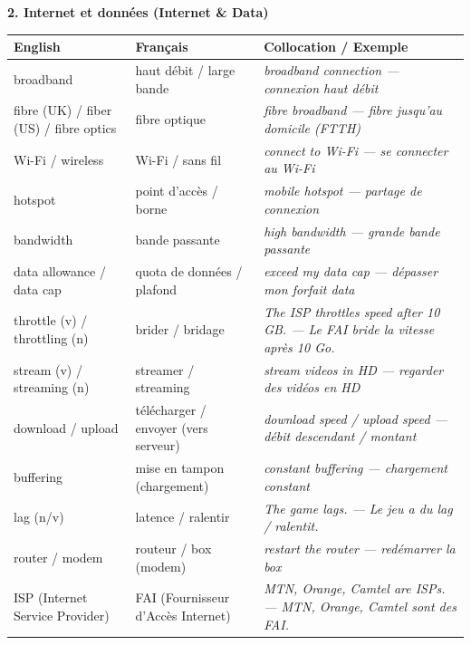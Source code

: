 \documentclass[11pt]{article}
\newcommand{\cle}[1]{{\popxbold\color{popdark}#1}}
\newcommand{\eng}[1]{\ifmmode\text{\textit{#1}}\else\begingroup\selectlanguage{english}\itshape #1\endgroup\fi}
\begin{document}
\textbf{2. Internet et données (Internet \& Data)}
\begin{center}
\begin{tabularx}{\linewidth}{|X|X|X|}\hline
\rowcolor{popgreenL} \textbf{English} & \textbf{Français} & \textbf{Collocation / Exemple} \\ \hline
\cle{broadband} & haut débit / large bande & \eng{broadband connection} — connexion haut débit \\ \hline
\cle{fibre (UK)} / \cle{fiber (US)} / \cle{fibre optics} & fibre optique & \eng{fibre broadband} — fibre jusqu'au domicile (FTTH) \\ \hline
\cle{Wi-Fi} / \cle{wireless} & Wi-Fi / sans fil & \eng{connect to Wi-Fi} — se connecter au Wi-Fi \\ \hline
\cle{hotspot} & point d'accès / borne & \eng{mobile hotspot} — partage de connexion \\ \hline
\cle{bandwidth} & bande passante & \eng{high bandwidth} — grande bande passante \\ \hline
\cle{data allowance} / \cle{data cap} & quota de données / plafond & \eng{exceed my data cap} — dépasser mon forfait data \\ \hline
\cle{throttle} (v) / \cle{throttling} (n) & brider / bridage & \eng{The ISP throttles speed after 10 GB.} — Le FAI bride la vitesse après 10 Go. \\ \hline
\cle{stream} (v) / \cle{streaming} (n) & streamer / streaming & \eng{stream videos in HD} — regarder des vidéos en HD \\ \hline
\cle{download} / \cle{upload} & télécharger / envoyer (vers serveur) & \eng{download speed} / \eng{upload speed} — débit descendant / montant \\ \hline
\cle{buffering} & mise en tampon (chargement) & \eng{constant buffering} — chargement constant \\ \hline
\cle{lag} (n/v) & latence / ralentir & \eng{The game lags.} — Le jeu a du lag / ralentit. \\ \hline
\cle{router} / \cle{modem} & routeur / box (modem) & \eng{restart the router} — redémarrer la box \\ \hline
\cle{ISP} (Internet Service Provider) & FAI (Fournisseur d'Accès Internet) & \eng{MTN, Orange, Camtel are ISPs.} — MTN, Orange, Camtel sont des FAI. \\ \hline
\end{tabularx}
\end{center}
\end{document}
